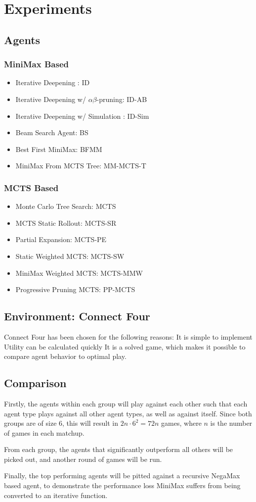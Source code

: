 \section{Experiments}
\subsection{Agents}
\subsubsection{MiniMax Based}
\begin{itemize}
    \item Iterative Deepening : ID
    \item Iterative Deepening w/ $\alpha\beta$-pruning: ID-AB
    \item Iterative Deepening w/ Simulation : ID-Sim
    \item Beam Search Agent: BS
    \item Best First MiniMax: BFMM
    \item MiniMax From MCTS Tree: MM-MCTS-T
\end{itemize}

\subsubsection{MCTS Based}
\begin{itemize}
    \item Monte Carlo Tree Search: MCTS
    \item MCTS Static Rollout: MCTS-SR
    \item Partial Expansion: MCTS-PE
    \item Static Weighted MCTS: MCTS-SW
    \item MiniMax Weighted MCTS: MCTS-MMW
    \item Progressive Pruning MCTS: PP-MCTS
\end{itemize}

\subsection{Environment: Connect Four}
Connect Four has been chosen for the following reasons:
It is simple to implement
Utility can be calculated quickly
It is a solved game, which makes it possible
to compare agent behavior to optimal play.


\subsection{Comparison}

Firstly, the agents within each group will play against each other
such that each agent type plays against all other agent types, as well
as against itself. Since both groups are of size 6, this will result
in $2n \cdot 6^2 = 72n$ games, where $n$ is the number of games in
each matchup.

From each group, the agents that significantly outperform all others
will be picked out, and another round of games will be run.

Finally, the top performing agents will be pitted against a recursive
NegaMax based agent, to demonstrate the performance loss MiniMax suffers
from being converted to an iterative function.